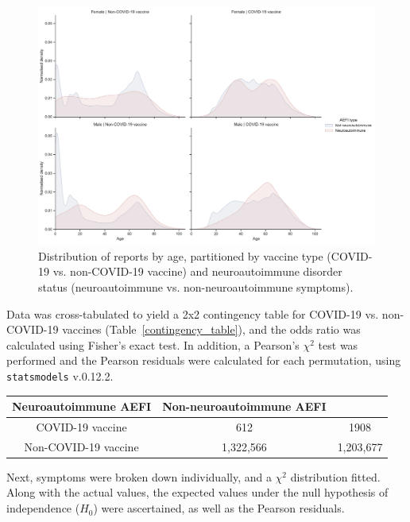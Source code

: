 \documentclass[idr,communication,submit,oneauthor,pdftex]{Definitions/mdpi}
\begin{document}
\begin{figure}[H]
\includegraphics[width=12.5 cm]{age_distribution}
\caption{Distribution of reports by age, partitioned by vaccine type (COVID-19 vs. non-COVID-19 vaccine) and
neuroautoimmune disorder status (neuroautoimmune vs. non-neuroautoimmune symptoms).\label{distribution_by_age}}
\end{figure}

Data was cross-tabulated to yield a 2x2 contingency table for COVID-19 vs. non-COVID-19 vaccines
(Table~\ref{contingency_table}), and the odds ratio was calculated using Fisher's exact test. In addition, a
Pearson's $\chi^2$ test was performed and the Pearson residuals were calculated for each permutation, using
\texttt{statsmodels} v.0.12.2.\cite{seabold2010statsmodels}

\begin{specialtable}[H]
\caption{2x2 contingency table by vaccine type (COVID-19 vs. non-COVID-19 vaccine) and neuroautoimmune
disorder status.\label{contingency_table}}
\begin{tabular}{ccc}
\toprule
\textbf{Neuroautoimmune AEFI}	& \textbf{Non-neuroautoimmune AEFI}\\
\midrule
COVID-19 vaccine	    	& 612			    & 1908  \\
Non-COVID-19 vaccine		& 1,322,566			& 1,203,677\\
\bottomrule
\end{tabular}
\end{specialtable}

Next, symptoms were broken down individually, and a $\chi^2$ distribution fitted. Along with the actual values, the
expected values under the null hypothesis of independence ($H_0$) were ascertained, as well as the Pearson residuals.
\end{document}
